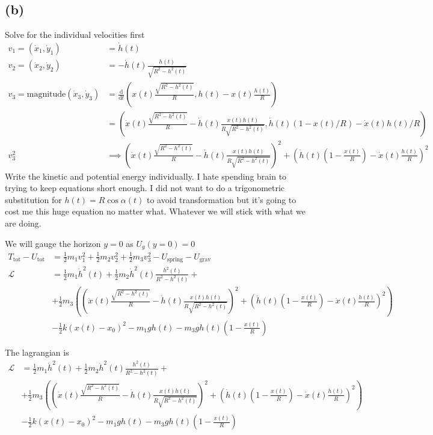 \documentclass[letter, 10pts]{article}
\begin{document}
\subsection*{(b)} 
Solve for the individual velocities first
\begin{align*}
	v_1 = (\dot x_1, \dot y_1) &= \dot h(t) \\
	v_2 = (\dot x_2, \dot y_2) &= - \dot h(t) \frac{h(t)}{\sqrt{R^2 - h^2(t)}}  \\
v_3 = 	\text{magnitude}(\dot x_3, \dot y_3) &=
\frac{\mathrm{d} }{\mathrm{d} t}
\left(x(t) \frac{\sqrt{R^2 - h^2(t) }  }{R} , h(t) - x(t) \frac{h(t)}{R}\right)  
\\&= 
\left(
\dot x(t) \frac{\sqrt{R^2 - h^2(t) }  }{ R} -
\dot h(t) \frac{x(t) h(t) }{R \sqrt{R^2 - h^2 (t )} }, 
\dot h(t) (1 - x(t) / R) - \dot x(t) h(t) / R
	\right)
\\
v_3^2 &\implies 
\left(
	\dot x(t) \frac{\sqrt{R^2 - h^2(t) }  }{ R} -
	\dot h(t) \frac{x(t) h(t) }{R \sqrt{R^2 - h^2 (t )} }
\right)^2 + 
\left(
	\dot h(t) \left(1 - \frac{x(t)}{R} \right) - \dot x(t) \frac{h(t)}{R}
\right)^2
\end{align*}
Write the kinetic and potential energy individually. I hate spending brain to trying to keep equations short enough. I did not want to do a trigonometric substitution for $h(t) = R \cos \alpha(t)$ to avoid transformation but it's going to cost me this huge equation no matter what. Whatever we will stick with what we are doing.  

We will gauge the horizon $y = 0$ as $U_g(y = 0) = 0$
\begin{align*}
	T_\text{tot}  - U_\text{tot}&= 
\frac{1}{2} m_1 v_1^2 + 
\frac{1}{2} m_2 v_2^2 + 
\frac{1}{2} m_3 v_3^2 - U_\text{spring} - U_\text{grav}
	\\ \mathcal L 
		     &=	\frac{1}{2} m_1 \dot h^2(t) + 
	\frac{1}{2} m_2 \dot h^2(t) \frac{h^2(t)}{R^2 - h^2 (t)} +  \\ &
+ 	\frac{1}{2} m_3 
	\left(
\left(
	\dot x(t) \frac{\sqrt{R^2 - h^2(t) }  }{ R} -
	\dot h(t) \frac{x(t) h(t) }{R \sqrt{R^2 - h^2 (t )} }
\right)^2 + 
\left(
	\dot h(t) \left(1 - \frac{x(t)}{R} \right) - \dot x(t) \frac{h(t)}{R}
\right)^2
	\right) \\ 
& - \frac{1}{2} k (x(t) - x_0)^2 - m_1 g h(t) - m_3 g h(t) \left(1 - \frac{x(t)}{ R} \right)
\end{align*}

The lagrangian is 
\begin{align*}
	 \mathcal L 
		     &=	\frac{1}{2} m_1 \dot h^2(t) + 
	\frac{1}{2} m_2 \dot h^2(t) \frac{h^2(t)}{R^2 - h^2 (t)} +  \\ &
+ 	\frac{1}{2} m_3 
	\left(
\left(
	\dot x(t) \frac{\sqrt{R^2 - h^2(t) }  }{ R} -
	\dot h(t) \frac{x(t) h(t) }{R \sqrt{R^2 - h^2 (t )} }
\right)^2 + 
\left(
	\dot h(t) \left(1 - \frac{x(t)}{R} \right) - \dot x(t) \frac{h(t)}{R}
\right)^2
	\right) \\ 
& - \frac{1}{2} k (x(t) - x_0)^2 - m_1 g h(t) - m_3 g h(t) \left(1 - \frac{x(t)}{ R} \right)
\end{align*}
\end{document}
